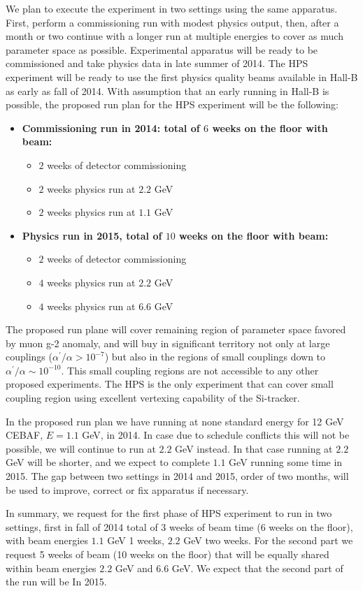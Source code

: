 We plan to execute the experiment in two settings using the same apparatus. First, perform a commissioning run with modest physics output, then, after a month or two continue with a longer run at multiple energies to cover as much parameter space as possible. Experimental apparatus will be ready to be commissioned and take physics data in late summer of 2014. The HPS experiment will be ready to use the first physics quality beams available in Hall-B as early as fall of 2014. With assumption that an early running in Hall-B is possible, the proposed run plan for the HPS experiment will be the following: 

\begin{itemize}
\item {\bf Commissioning run in 2014: total of $6$ weeks on the floor with beam:}
\begin{itemize}
\item $2$ weeks of detector commissioning
\item $2$ weeks physics run at $2.2$ GeV
\item $2$ weeks physics run at $1.1$ GeV
\end{itemize}
\item{\bf Physics run in 2015, total of $10$ weeks on the floor with beam:}
\begin{itemize}
\item $2$ weeks of detector commissioning
\item $4$ weeks physics run at $2.2$ GeV
\item $4$ weeks physics run at $6.6$ GeV
\end{itemize}
\end{itemize}

The proposed run plane will cover remaining region of parameter space favored by muon g-2 anomaly, and will buy in significant territory not only at large couplings ($\alpha^\prime/\alpha>10^{-7}$) but also in the regions of small couplings down to $\alpha^\prime/\alpha\sim 10^{-10}$. This small coupling regions are not accessible to any other proposed experiments. The HPS is the only experiment that can cover small coupling region using excellent vertexing capability of the Si-tracker. 

In the proposed run plan we have running at none standard energy for 12 GeV CEBAF, $E=1.1$ GeV, in 2014. In case due to schedule conflicts this will not be possible, we will continue to run at $2.2$ GeV instead. In that case running at $2.2$ GeV will be shorter, and we expect to complete $1.1$ GeV running some time in 2015. The gap between two settings in 2014 and 2015, order of two months, will be used to improve, correct or fix apparatus if necessary.

In summary, we request for the first phase of HPS experiment to run in two settings, first in fall of 2014 total of 3 weeks of beam time (6 weeks on the floor), with beam energies $1.1$ GeV 1 weeks, $2.2$ GeV two weeks. For the second part we request 5 weeks of beam (10 weeks on the floor) that will be equally shared within beam energies $2.2$ GeV and $6.6$ GeV. We expect that the second part of the run will be In 2015.   

